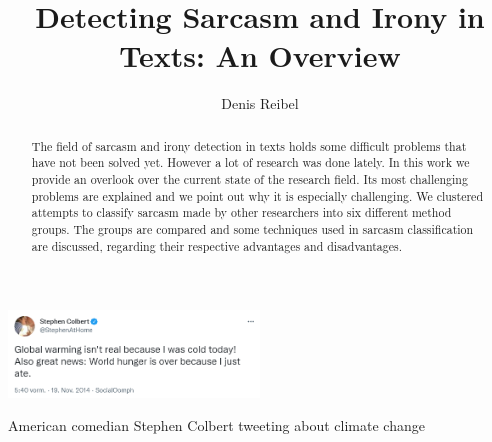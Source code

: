 \documentclass[sigconf,  review=false, nonacm=true]{acmart}
\begin{document}
\title{Detecting Sarcasm and Irony in Texts: An Overview}

\author{Denis Reibel}

\renewcommand{\shortauthors}{Denis Reibel}

\begin{abstract}
  The field of sarcasm and irony detection in texts holds some difficult problems that have not been solved yet. However a lot of research was done lately. In this work we provide an overlook over the current state of the research field. Its most challenging problems are explained and we point out why it is especially challenging. We clustered attempts to classify sarcasm made by other researchers into six different method groups. The groups are compared and some techniques used in sarcasm classification are discussed, regarding their respective advantages and disadvantages.
\end{abstract}


\begin{teaserfigure}
  \centering
  \includegraphics[width=0.5\textwidth]{./sources/teaser_tweet}
  \caption{American comedian Stephen Colbert tweeting about climate change}
  \label{fig:teaser}
\end{teaserfigure}
\end{document}
